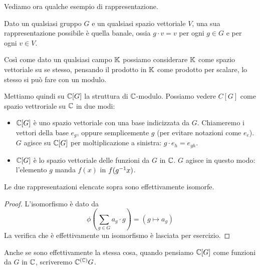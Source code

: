 	Vediamo ora qualche esempio di rappresentazione.

	\begin{myexample}
		Dato un qualsiasi gruppo $G$ e un qualsiasi spazio vettoriale $V$, una sua rappresentazione possibile è quella banale, ossia  $g\cdot v = v$ per ogni $g\in G$ e per ogni $v\in V$.
	\end{myexample}
	\begin{myexample}
		Così come dato un qualsiasi campo $\mathbb K$ possiamo considerare $\mathbb K$ come spazio vettoriale su se stesso, pensando il prodotto in $\mathbb K$ come prodotto per scalare, lo stesso si può fare con un modulo.
		
		Mettiamo quindi su $\bC[G]$ la struttura di $\mathbb C$-modulo. Possiamo vedere $C[G]$ come spazio vettroriale su $\mathbb C$ in due modi:
		\begin{itemize}
		 \item $\bC[G]$ è uno spazio vettoriale con una base indicizzata da $G$. Chiameremo i vettori della base $e_g$, oppure semplicemente $g$ (per evitare notazioni come $e_e$). $G$ agisce su $\bC[G]$ per moltiplicazione a sinistra: $g\cdot e_h = e_{gh}$.
		 \item $\bC[G]$ è lo spazio vettoriale delle funzioni da $G$ in $\mathbb C$. $G$ agisce in questo modo: l'elemento $g$ manda $f(x)$ in $f(g^{-1} x)$.
		\end{itemize}
		
		\begin{myprop}
		 Le due rappresentazioni elencate sopra sono effettivamente isomorfe.
		\end{myprop}
		\begin{proof}
		 L'isomorfismo è dato da \[\phi\left(\sum_{g\in G} a_g\cdot g\right)= \left(g\mapsto a_g\right)\]
		 La verifica che è effettivamente un isomorfismo è lasciata per esercizio.
		\end{proof}

		Anche se sono effettivamente la stessa cosa, quando pensiamo $\bC[G]$ come funzioni da $G$ in $\mathbb C$, scriveremo $\mathbb C^{(\mathbb C)} G$.
		
		\iffalse
				Sia $G$ un gruppo finito, e sia $V$ uno spazio vettoriale con base indicizzata da $G$ (ci starebbe una digressione sulla definizione di base). La rappresentazione regolare $\Reg$ è quella rappresentazione che associa a ogni elemento del gruppo l'azione di \emph{moltiplicazione a sinistra} sulla base, ossia $\Reg_g: e_h \mapsto e_{gh}$.
				
				Alternativamente, posso vedere $V$ come lo spazio $\mathbb C[G]$ delle funzioni da $G$ in $\mathbb C$ (l'indentificazione è quella che manda il vettore $\sum_i a_ie_{g_i}$ nella mappa $g_i \mapsto a_i$). In tal caso la rappresentazione regolare diventa
			\[
				\Reg_g(f): x \mapsto  f ( g\inv x) 
				\]
				
				Questa rappresentazione è particolarmente importante perché coincide con $\bC[G]$ visto come $\bC[G]$-modulo, che è sostanzialmente la prima definizione.
				
				Vedremo l'importanza di questa rappresentazione.

		\fi
	\end{myexample}
